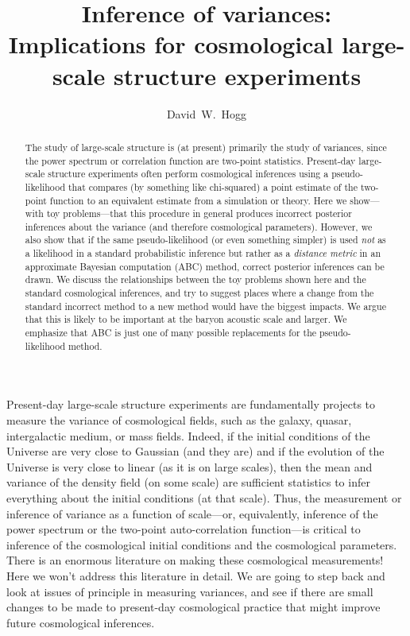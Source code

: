 \documentclass[12pt, letterpaper, preprint]{aastex}
\begin{document}
\sloppy\sloppypar\frenchspacing %

\title{Inference of variances:\\
       Implications for cosmological large-scale structure experiments}
\author{
  David~W.~Hogg
}

\begin{abstract}
The study of large-scale structure is (at present) primarily the study
of variances, since the power spectrum or correlation function are
two-point statistics.
Present-day large-scale structure experiments often perform
cosmological inferences using a pseudo-likelihood that compares (by something like chi-squared) a
point estimate of the two-point function to an equivalent estimate
from a simulation or theory.
Here we show---with toy problems---that this procedure in general
produces incorrect posterior inferences about the variance (and
therefore cosmological parameters).
However, we also show that if the same pseudo-likelihood (or even something simpler) is used
\emph{not} as a likelihood in a standard probabilistic inference but
rather as a \emph{distance metric} in an approximate Bayesian
computation (ABC) method, correct posterior inferences can be drawn.
We discuss the relationships between the toy problems shown here and
the standard cosmological inferences, and try to suggest places where
a change from the standard incorrect method to a new method would
have the biggest impacts.
We argue that this is likely to be important at the baryon acoustic
scale and larger.
We emphasize that ABC is just one of many possible replacements for
the pseudo-likelihood method.
\end{abstract}


Present-day large-scale structure experiments are fundamentally
projects to measure the variance of cosmological fields, such as the
galaxy, quasar, intergalactic medium, or mass fields.
Indeed, if the initial conditions of the Universe are very close to
Gaussian (and they are) and if the evolution of the Universe is very
close to linear (as it is on large scales), then the mean and variance
of the density field (on some scale) are sufficient statistics to
infer everything about the initial conditions (at that scale).
Thus, the measurement or inference of variance as a function of
scale---or, equivalently, inference of the power spectrum or the
two-point auto-correlation function---is critical to inference of the
cosmological initial conditions and the cosmological parameters.
There is an enormous literature on making these cosmological
measurements!
Here we won't address this literature in detail.
We are going to step back and look at issues of principle in measuring
variances, and see if there are small changes to be made to
present-day cosmological practice that might improve future cosmological
inferences.
\end{document}
